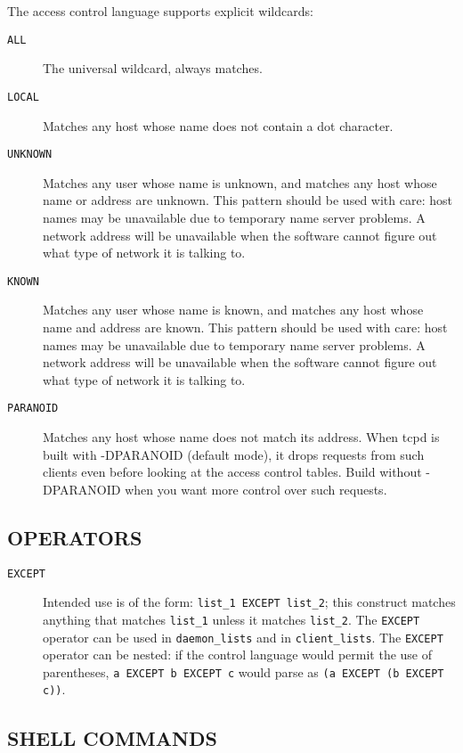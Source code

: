 \documentclass[11pt,twoside,onecolumn]{book}
\begin{document}
The access control language supports explicit wildcards:

\begin{description}
\item[\tt ALL] The universal wildcard, always matches.
\item[\tt LOCAL] Matches any host whose name does not contain a dot character.
\item[\tt UNKNOWN] 
Matches any user whose name is unknown, and matches any host whose name
or address are unknown.  This pattern should be used with care:
host names may be unavailable due to temporary name server problems. A
network address will be unavailable when the software cannot figure out
what type of network it is talking to.
\item[\tt KNOWN]
Matches any user whose name is known, and matches any host whose name
and address are known. This pattern should be used with care:
host names may be unavailable due to temporary name server problems.  A
network address will be unavailable when the software cannot figure out
what type of network it is talking to.
\item[\tt PARANOID]
Matches any host whose name does not match its address.  When tcpd is
built with -DPARANOID (default mode), it drops requests from such
clients even before looking at the access control tables.  Build
without -DPARANOID when you want more control over such requests.

\end{description}

\subsection*{OPERATORS}

\begin{description}

\item[\tt EXCEPT]
Intended use is of the form: {\tt list\_1 EXCEPT list\_2}; this construct
matches anything that matches {\tt list\_1} unless it matches
{\tt list\_2}.  The {\tt EXCEPT} operator can be used in {\tt daemon\_lists} and in
{\tt client\_lists}. The {\tt EXCEPT} operator can be nested: if the control
language would permit the use of parentheses, {\tt a EXCEPT b EXCEPT c}
would parse as {\tt (a EXCEPT (b EXCEPT c))}.

\end{description}

\subsection*{SHELL COMMANDS}
\end{document}
